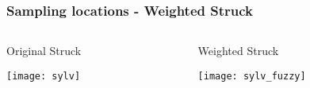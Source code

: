 \begin{frame}
    \frametitle{Sampling locations - Weighted Struck}
    \begin{columns}
        \begin{column}{0.5\textwidth}
            Original Struck

            \texttt{[image: sylv]}
        \end{column}
        \begin{column}{0.5\textwidth}
            Weighted Struck

            \texttt{[image: sylv\_fuzzy]}
        \end{column}
    \end{columns}
\end{frame}

